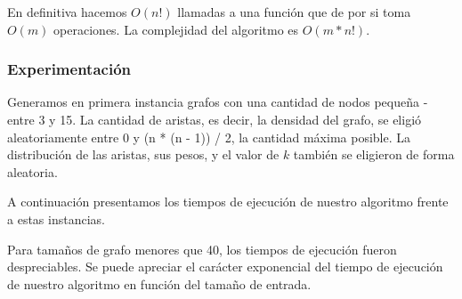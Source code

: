 En definitiva hacemos $O(n!)$ llamadas a una función que de por si toma $O(m)$ operaciones. La complejidad del algoritmo es $O(m*n!)$.

\subsubsection{Experimentación}

Generamos en primera instancia grafos con una cantidad de nodos pequeña - entre 3 y 15. La cantidad de aristas, es decir, la densidad del grafo,
se eligió aleatoriamente entre 0 y (n * (n - 1)) / 2, la cantidad máxima posible. La distribución de las aristas, sus pesos, y el valor de $k$
también se eligieron de forma aleatoria.

A continuación presentamos los tiempos de ejecución de nuestro algoritmo frente a estas instancias. 



Para tamaños de grafo menores que 40, los tiempos de ejecución fueron despreciables. Se puede apreciar el carácter exponencial del tiempo de
ejecución de nuestro algoritmo en función del tamaño de entrada.

